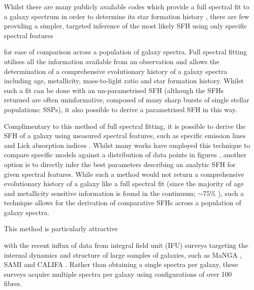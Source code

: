 \documentclass[useAMS,usenatbib]{mn2e}
\def\referee		{\color{refer}}
\begin{document}
Whilst there are many publicly available codes which provide a full spectral fit to a galaxy spectrum in order to determine its star formation history \citep[SFH;][]{cappellari04, cidfernandes05, ocvirk06, tojeiro07, noll09, conroy14, chevallard16, wilkinson17}, there are few providing a simpler, targeted inference of the most likely SFH using only specific spectral features {\referee for ease of comparison across a population of galaxy spectra. Full spectral fitting utilises all the information available from an observation and allows the determination of a comprehensive evolutionary history of a galaxy spectra including age, metallicity, mass-to-light ratio and star formation history. Whilst such a fit can be done with an un-parametrised SFH (although the SFHs returned are often uninformative, composed of many sharp bursts of single stellar populations; SSPs), it also possible to derive a parametrised SFH in this way. 

Complimentary to this method of full spectral fitting, it is possible to derive the SFH of a galaxy using measured spectral features, such as specific emission lines and Lick absorption indices \citep{burstein84, faber85, burstein86, gorgas93, worthey94b, trager98}. Whilst many works have employed this technique to compare specific models against a distribution of data points in figures \citep{li15, wang18, zick18}, another option is to directly infer the best parameters describing an analytic SFH for given spectral features. While such a method would not return a comprehensive evolutionary history of a galaxy like a full spectral fit (since the majority of age and metallicity sensitive information is found in the continuum; $\sim75\%$ \citealt{chill09, chill11}), such a technique allows for the derivation of comparative SFHs across a population of galaxy spectra.


This method is particularly attractive} with the recent influx of data from integral field unit (IFU) surveys targeting the internal dynamics and structure of large samples of galaxies, such as MaNGA \protect\citep[Mapping Nearby Galaxies at Apache Point Observatory;][]{bundy15}, SAMI \protect\citep[Sydney-AAO Multi-object Integral-field spectrograph;][]{bryant12} and CALIFA \protect\citep[Calar Alto Legacy Integral Field spectroscopy Area survey;][]{sanchez12}. Rather than obtaining a single spectra per galaxy, these surveys acquire multiple spectra per galaxy using {\referee configurations} of over 100 fibres. 
\end{document}
